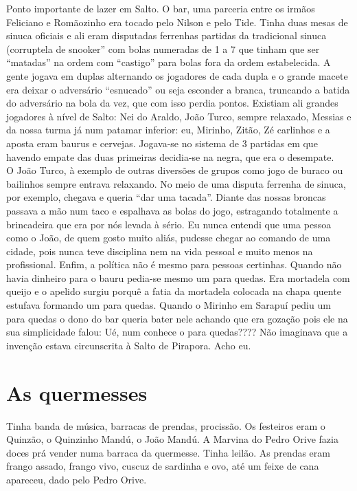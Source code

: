 \documentclass[12pt,brazil,]{book}
\begin{document}
Ponto importante de lazer em Salto. O bar, uma parceria entre os irmãos
Feliciano e Romãozinho era tocado pelo Nilson e pelo Tide. Tinha duas
mesas de sinuca oficiais e ali eram disputadas ferrenhas partidas da
tradicional sinuca (corruptela de snooker'' com bolas numeradas de 1 a 7
que tinham que ser ``matadas'' na ordem com ``castigo'' para bolas fora
da ordem estabelecida. A gente jogava em duplas alternando os jogadores
de cada dupla e o grande macete era deixar o adversário ``esnucado'' ou
seja esconder a branca, truncando a batida do adversário na bola da vez,
que com isso perdia pontos. Existiam ali grandes jogadores à nível de
Salto: Nei do Araldo, João Turco, sempre relaxado, Messias e da nossa
turma já num patamar inferior: eu, Mirinho, Zitão, Zé carlinhos e a
aposta eram baurus e cervejas. Jogava-se no sistema de 3 partidas em que
havendo empate das duas primeiras decidia-se na negra, que era o
desempate.\\
O João Turco, à exemplo de outras diversões de grupos como jogo de
buraco ou bailinhos sempre entrava relaxando. No meio de uma disputa
ferrenha de sinuca, por exemplo, chegava e queria ``dar uma tacada''.
Diante das nossas broncas passava a mão num taco e espalhava as bolas do
jogo, estragando totalmente a brincadeira que era por nós levada à
sério. Eu nunca entendi que uma pessoa como o João, de quem gosto muito
aliás, pudesse chegar ao comando de uma cidade, pois nunca teve
disciplina nem na vida pessoal e muito menos na profissional. Enfim, a
política não é mesmo para pessoas certinhas. Quando não havia dinheiro
para o bauru pedia-se mesmo um para quedas. Era mortadela com queijo e o
apelido surgiu porquê a fatia da mortadela colocada na chapa quente
estufava formando um para quedas. Quando o Mirinho em Sarapuí pediu um
para quedas o dono do bar queria bater nele achando que era gozação pois
ele na sua simplicidade falou: Ué, num conhece o para quedas???? Não
imaginava que a invenção estava circunscrita à Salto de Pirapora. Acho
eu.

\section{As quermesses}\label{as-quermesses}

Tinha banda de música, barracas de prendas, procissão. Os festeiros eram
o Quinzão, o Quinzinho Mandú, o João Mandú. A Marvina do Pedro Orive
fazia doces prá vender numa barraca da quermesse. Tinha leilão. As
prendas eram frango assado, frango vivo, cuscuz de sardinha e ovo, até
um feixe de cana apareceu, dado pelo Pedro Orive.
\end{document}
